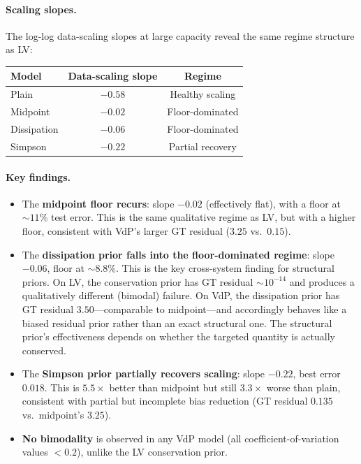 \documentclass[11pt]{article}
\begin{document}
\paragraph{Scaling slopes.}
The log-log data-scaling slopes at large capacity reveal the same regime structure as LV:

\begin{center}
\begin{tabular}{lcc}
\toprule
Model & Data-scaling slope & Regime \\
\midrule
Plain       & $-0.58$ & Healthy scaling \\
Midpoint    & $-0.02$ & Floor-dominated \\
Dissipation & $-0.06$ & Floor-dominated \\
Simpson     & $-0.22$ & Partial recovery \\
\bottomrule
\end{tabular}
\end{center}

\paragraph{Key findings.}
\begin{itemize}[leftmargin=*]
    \item The \textbf{midpoint floor recurs}: slope $-0.02$ (effectively flat), with a floor at $\sim\!11\%$ test error.
    This is the same qualitative regime as LV, but with a higher floor, consistent with VdP's larger GT residual ($3.25$ vs.\ $0.15$).
    \item The \textbf{dissipation prior falls into the floor-dominated regime}: slope $-0.06$, floor at $\sim\!8.8\%$.
    This is the key cross-system finding for structural priors.
    On LV, the conservation prior has GT residual $\sim\!10^{-14}$ and produces a qualitatively different (bimodal) failure.
    On VdP, the dissipation prior has GT residual $3.50$---comparable to midpoint---and accordingly behaves like a biased residual prior rather than an exact structural one.
    The structural prior's effectiveness depends on whether the targeted quantity is actually conserved.
    \item The \textbf{Simpson prior partially recovers scaling}: slope $-0.22$, best error $0.018$.
    This is $5.5\times$ better than midpoint but still $3.3\times$ worse than plain, consistent with partial but incomplete bias reduction (GT residual $0.135$ vs.\ midpoint's $3.25$).
    \item \textbf{No bimodality} is observed in any VdP model (all coefficient-of-variation values $< 0.2$), unlike the LV conservation prior.
\end{itemize}
\end{document}
